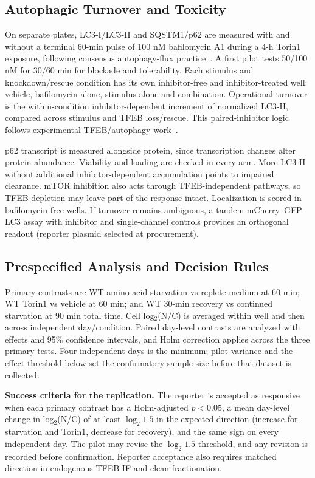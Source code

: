 \subsection{Autophagic Turnover and Toxicity}
On separate plates, LC3-I/LC3-II and SQSTM1/p62 are measured with and without a terminal 60-min pulse of 100 nM bafilomycin A1 during a 4-h Torin1 exposure, following consensus autophagy-flux practice~\cite{Klionsky2021}. A first pilot tests 50/100 nM for 30/60 min for blockade and tolerability. Each stimulus and knockdown/rescue condition has its own inhibitor-free and inhibitor-treated well: vehicle, bafilomycin alone, stimulus alone and combination. Operational turnover is the within-condition inhibitor-dependent increment of normalized LC3-II, compared across stimulus and TFEB loss/rescue. This paired-inhibitor logic follows experimental TFEB/autophagy work~\cite{Settembre2011}.

p62 transcript is measured alongside protein, since transcription changes alter protein abundance. Viability and loading are checked in every arm. More LC3-II without additional inhibitor-dependent accumulation points to impaired clearance. mTOR inhibition also acts through TFEB-independent pathways, so TFEB depletion may leave part of the response intact. Localization is scored in bafilomycin-free wells. If turnover remains ambiguous, a tandem mCherry--GFP--LC3 assay with inhibitor and single-channel controls provides an orthogonal readout (reporter plasmid selected at procurement).

\subsection{Prespecified Analysis and Decision Rules}
Primary contrasts are WT amino-acid starvation vs replete medium at 60 min; WT Torin1 vs vehicle at 60 min; and WT 30-min recovery vs continued starvation at 90 min total time. Cell log$_2$(N/C) is averaged within well and then across independent day/condition. Paired day-level contrasts are analyzed with effects and 95\% confidence intervals, and Holm correction applies across the three primary tests. Four independent days is the minimum; pilot variance and the effect threshold below set the confirmatory sample size before that dataset is collected.

\textbf{Success criteria for the replication.} The reporter is accepted as responsive when each primary contrast has a Holm-adjusted $p<0.05$, a mean day-level change in log$_2$(N/C) of at least $\log_2 1.5$ in the expected direction (increase for starvation and Torin1, decrease for recovery), and the same sign on every independent day. The pilot may revise the $\log_2 1.5$ threshold, and any revision is recorded before confirmation. Reporter acceptance also requires matched direction in endogenous TFEB IF and clean fractionation.

